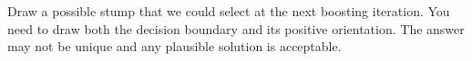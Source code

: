 \item {} Draw  a possible stump that we could select at the next boosting iteration. You need to draw both the decision boundary and its positive orientation. The answer may not be unique and any plausible solution is acceptable.